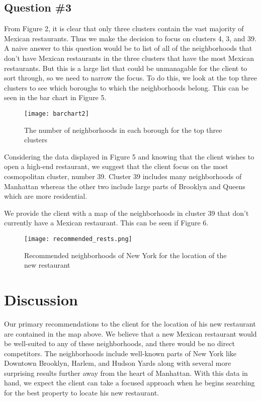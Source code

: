 \documentclass{article}
\begin{document}
\subsection{Question \#3}

From Figure 2, it is clear that only three clusters contain the vast majority of Mexican restaurants. Thus we make the decision to focus on clusters 4, 3, and 39. A naive answer to this question would be to list of all of the neighborhoods that don't have Mexican restaurants in the three clusters that have the most Mexican restaurants. But this is a large list that could be unmanagable for the client to sort through, so we need to narrow the focus. To do this, we look at the top three clusters to see which boroughs to which the neighborhoods belong. This can be seen in the bar chart in Figure 5.

\begin{figure}[h!]
\texttt{[image: barchart2]}
\centering
\caption[Figure 2]{The number of neighborhoods in each borough for the top three clusters}
\end{figure}

Considering the data displayed in Figure 5 and knowing that the client wishes to open a high-end restaurant, we suggest that the client focus on the most cosmopolitan cluster, number 39. Cluster 39 includes many neighborhoods of Manhattan whereas the other two include large parts of Brooklyn and Queens which are more residential.

We provide the client with a map of the neighborhoods in cluster 39 that don't currently have a Mexican restaurant. This can be seen if Figure 6.

\begin{figure}[h]
\texttt{[image: recommended\_rests.png]}
\centering
\caption{Recommended neighborhoods of New York for the location of the new restaurant}
\end{figure}

\section{Discussion}

Our primary recommendations to the client for the location of his new restaurant are contained in the map above. We believe that a new Mexican restaurant would be well-suited to any of these neighborhoods, and there would be no direct competitors. The neighborhoods include well-known parts of New York like Downtown Brooklyn, Harlem, and Hudson Yards along with several more surprising results further away from the heart of Manhattan. With this data in hand, we expect the client can take a focused approach when he begins searching for the best property to locate his new restaurant.
\end{document}
